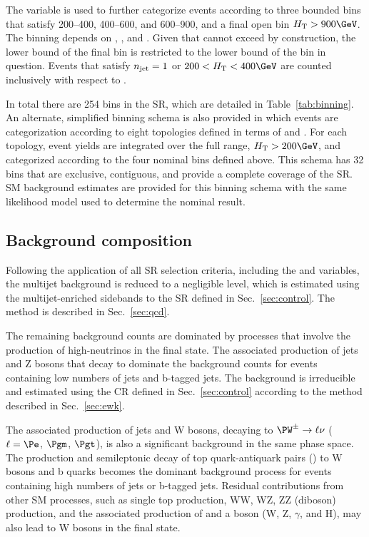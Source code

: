 The \mht variable is used to further categorize events according to
three bounded bins that satisfy 200--400, 400--600, and 600--900, and
a final open bin $\scalht > 900\GeV$. The \mht binning depends on
\njet, \nb, and \scalht. Given that \mht cannot exceed \scalht by
construction, the lower bound of the final \mht bin is restricted to
the lower bound of the \scalht bin in question. Events that satisfy
$n_{\text{jet}} = 1$ or $200 < \scalht < 400\GeV$ are counted inclusively with
respect to \mht.

In total there are 254 bins in the SR, which are detailed in
Table~\ref{tab:binning}. An alternate, simplified binning schema is
also provided in which events are categorization according to eight
topologies defined in terms of \njet and \nb. For each topology, event
yields are integrated over the full \scalht range, $\scalht >
200\GeV$, and categorized according to the four nominal \mht bins
defined above. This schema has 32 bins that are exclusive, contiguous,
and provide a complete coverage of the SR. SM background estimates are
provided for this binning schema with the same likelihood model used
to determine the nominal result.


\subsection{Background composition}
\label{sec:bkgd}

Following the application of all SR selection criteria, including the
\alphat and \bdphi variables, the multijet background is reduced to a
negligible level, which is estimated using the multijet-enriched
sidebands to the SR defined in Sec.~\ref{sec:control}. The method is
described in Sec.~\ref{sec:qcd}.

The remaining background counts are dominated by processes that
involve the production of high-\pt neutrinos in the final state. The
associated production of jets and Z bosons that decay to \znunu
dominate the background counts for events containing low numbers of
jets and b-tagged jets. The \znunuj background is irreducible and
estimated using the \mmj CR defined in Sec.~\ref{sec:control}
according to the method described in Sec.~\ref{sec:ewk}. 

The associated production of jets and W bosons, decaying to $\PW^\pm
\to \ell\nu$ ($\ell=\Pe$, $\Pgm$, $\Pgt$), is also a significant
background in the same phase space. The production and semileptonic
decay of top quark-antiquark pairs (\ttbar) to W bosons and b quarks
becomes the dominant background process for events containing high
numbers of jets or b-tagged jets. Residual contributions from other SM
processes, such as single top production, WW, WZ, ZZ (diboson)
production, and the associated production of \ttbar and a boson
({\ttbar}W, {\ttbar}Z, {\ttbar}$\gamma$, and {\ttbar}H), may also lead
to W bosons in the final state.

